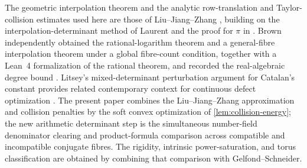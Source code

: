 \documentclass[11pt]{article}
\theoremstyle{definition}
\theoremstyle{remark}
\numberwithin{equation}{section}
\begin{document}
The geometric interpolation theorem and the analytic row-translation
and Taylor-collision estimates used here are those of Liu--Jiang--Zhang
\cite{LiuJiangZhang2026}, building on the interpolation-determinant
method of Laurent \cite{Laurent1991,Laurent2000} and the proof for
$\pi$ in \cite{OpenAI2026}.  Brown independently obtained the
rational-logarithm theorem and a general-fibre interpolation theorem
under a global fibre-count condition, together with a Lean~4
formalization of the rational theorem, and recorded the real-algebraic
degree bound \cite{Brown2026}.  Litsey's mixed-determinant perturbation
argument for Catalan's constant provides related contemporary context
for continuous defect optimization \cite{Litsey2026}.  The present
paper combines the Liu--Jiang--Zhang approximation and collision
penalties by the soft convex optimization of
\cref{lem:collision-energy}; the new arithmetic determinant step is the
simultaneous number-field denominator clearing and product-formula
comparison across compatible and incompatible conjugate fibres.  The
rigidity, intrinsic power-saturation, and torus classification are
obtained by combining that comparison with Gelfond--Schneider.

\renewcommand*{\bibfont}{\small}
\printbibliography
\end{document}
